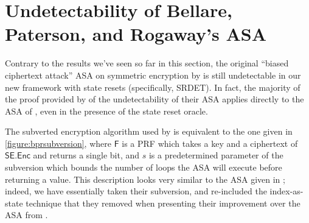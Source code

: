 \section{Undetectability of Bellare, Paterson, and Rogaway's ASA} \label{sec:bpranalysis}

Contrary to the results we've seen so far in this section, the original ``biased ciphertext attack'' ASA on symmetric encryption by \cite{C:BelPatRog14} is still undetectable in our new framework with state resets (specifically, SRDET). In fact, the majority of the proof provided by \cite{CCS:BelJaeKan15} of the undetectability of their ASA applies directly to the ASA of \cite{C:BelPatRog14}, even in the presence of the state reset oracle.

The subverted encryption algorithm used by \cite{C:BelPatRog14} is equivalent to the one given in \autoref{figure:bprsubversion}, where $\mathsf{F}$ is a PRF which takes a key and a ciphertext of $\mathsf{SE.Enc}$ and returns a single bit, and $s$ is a predetermined parameter of the subversion which bounds the number of loops the ASA will execute before returning a value. This description looks very similar to the ASA given in \cite{CCS:BelJaeKan15}; indeed, we have essentially taken their subversion, and re-included the index-as-state technique that they removed when presenting their improvement over the ASA from \cite{C:BelPatRog14}.


